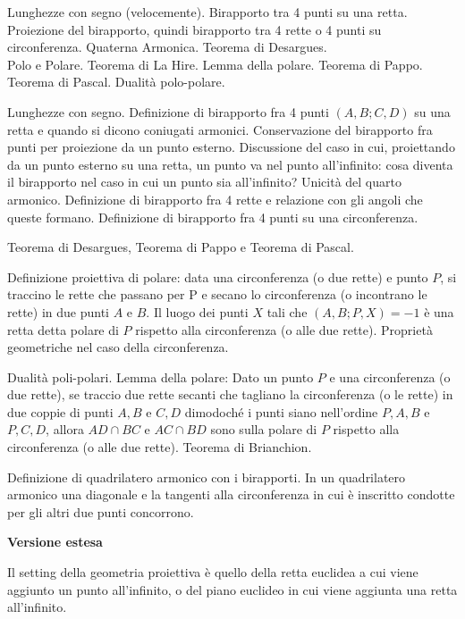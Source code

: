 \begin{short}
 Lunghezze con segno (velocemente). Birapporto tra 4 punti su una retta. Proiezione del birapporto, quindi birapporto tra 4 rette o 4 punti su circonferenza. Quaterna Armonica. Teorema di Desargues.\\
 Polo e Polare. Teorema di La Hire. Lemma della polare. Teorema di Pappo. Teorema di Pascal. Dualità polo-polare. 
\end{short}

Lunghezze con segno. Definizione di birapporto fra 4 punti $(A,B;C,D)$ su una retta e quando si dicono coniugati armonici. Conservazione del birapporto fra punti per proiezione da un punto esterno. Discussione del caso in cui, proiettando da un punto esterno su una retta, un punto va nel punto all'infinito: cosa diventa il birapporto nel caso in cui un punto sia all'infinito? Unicità del quarto armonico. 
Definizione di birapporto fra 4 rette e relazione con gli angoli che queste formano. Definizione di birapporto fra 4 punti su una circonferenza.

Teorema di Desargues, Teorema di Pappo e Teorema di Pascal.


\vspace{0.5cm}

Definizione proiettiva di polare: data una circonferenza (o due rette) e punto $P$, si traccino le rette che passano per P e secano lo circonferenza (o incontrano le rette) in due punti $A$ e $B$. Il luogo dei punti $X$ tali che $(A,B;P,X)=-1$ è una retta detta polare di $P$ rispetto alla circonferenza (o alle due rette).  Proprietà geometriche nel caso della circonferenza.

Dualità poli-polari. Lemma della polare: Dato un punto $P$ e una circonferenza (o due rette), se traccio due rette secanti che tagliano la circonferenza (o le rette) in due coppie di punti $A,B$ e $C,D$ dimodoché i punti siano nell'ordine $P,A,B$ e $P,C,D$, allora $AD\cap BC$ e $AC\cap BD$ sono sulla polare di $P$ rispetto alla circonferenza (o alle due rette).  Teorema di Brianchion.

Definizione di quadrilatero armonico con i birapporti. In un quadrilatero armonico una diagonale e la tangenti alla circonferenza in cui è inscritto condotte per gli altri due punti concorrono.


\vspace{0.3cm}
\large{\textbf{Versione estesa}}\normalsize

\vspace{0.3cm}
Il setting della geometria proiettiva è quello della retta euclidea a cui viene aggiunto un punto all'infinito, o del piano euclideo in cui viene aggiunta una retta all'infinito.

